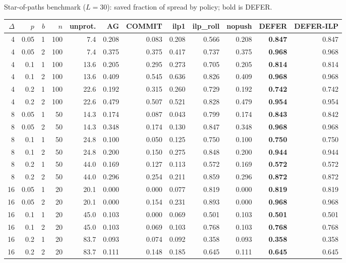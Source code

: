 \documentclass[ijoc,sglanonrev]{informs4}
\begin{document}
\begin{table}[h]
\TABLE
{Star-of-paths benchmark ($L=30$): saved fraction of spread by policy; bold is DEFER.\label{tab:sop}}
{\footnotesize
\begin{tabular}{rrrrrrrrrrrr}
\hline
$\Delta$ & $p$ & $b$ & $n$ & unprot. & AG & COMMIT & ilp1 & ilp\_roll & nopush & DEFER & DEFER-ILP \\
\hline
4 & 0.05 & 1 & 100 & 7.4 & 0.208 & 0.083 & 0.208 & 0.566 & 0.208 & \textbf{0.847} & 0.847 \\
4 & 0.05 & 2 & 100 & 7.4 & 0.375 & 0.375 & 0.417 & 0.737 & 0.375 & \textbf{0.968} & 0.968 \\
4 & 0.1 & 1 & 100 & 13.6 & 0.205 & 0.295 & 0.273 & 0.705 & 0.205 & \textbf{0.814} & 0.814 \\
4 & 0.1 & 2 & 100 & 13.6 & 0.409 & 0.545 & 0.636 & 0.826 & 0.409 & \textbf{0.968} & 0.968 \\
4 & 0.2 & 1 & 100 & 22.6 & 0.192 & 0.315 & 0.260 & 0.729 & 0.192 & \textbf{0.742} & 0.742 \\
4 & 0.2 & 2 & 100 & 22.6 & 0.479 & 0.507 & 0.521 & 0.828 & 0.479 & \textbf{0.954} & 0.954 \\
8 & 0.05 & 1 & 50 & 14.3 & 0.174 & 0.087 & 0.043 & 0.799 & 0.174 & \textbf{0.843} & 0.842 \\
8 & 0.05 & 2 & 50 & 14.3 & 0.348 & 0.174 & 0.130 & 0.847 & 0.348 & \textbf{0.968} & 0.968 \\
8 & 0.1 & 1 & 50 & 24.8 & 0.100 & 0.050 & 0.125 & 0.750 & 0.100 & \textbf{0.750} & 0.750 \\
8 & 0.1 & 2 & 50 & 24.8 & 0.200 & 0.150 & 0.275 & 0.848 & 0.200 & \textbf{0.944} & 0.944 \\
8 & 0.2 & 1 & 50 & 44.0 & 0.169 & 0.127 & 0.113 & 0.572 & 0.169 & \textbf{0.572} & 0.572 \\
8 & 0.2 & 2 & 50 & 44.0 & 0.296 & 0.254 & 0.211 & 0.859 & 0.296 & \textbf{0.872} & 0.872 \\
16 & 0.05 & 1 & 20 & 20.1 & 0.000 & 0.000 & 0.077 & 0.819 & 0.000 & \textbf{0.819} & 0.819 \\
16 & 0.05 & 2 & 20 & 20.1 & 0.000 & 0.154 & 0.231 & 0.893 & 0.000 & \textbf{0.968} & 0.968 \\
16 & 0.1 & 1 & 20 & 45.0 & 0.103 & 0.000 & 0.069 & 0.501 & 0.103 & \textbf{0.501} & 0.501 \\
16 & 0.1 & 2 & 20 & 45.0 & 0.103 & 0.069 & 0.103 & 0.768 & 0.103 & \textbf{0.768} & 0.768 \\
16 & 0.2 & 1 & 20 & 83.7 & 0.093 & 0.074 & 0.092 & 0.358 & 0.093 & \textbf{0.358} & 0.358 \\
16 & 0.2 & 2 & 20 & 83.7 & 0.111 & 0.148 & 0.185 & 0.645 & 0.111 & \textbf{0.645} & 0.645 \\
\hline
\end{tabular}}{}
\end{table}
\end{document}

